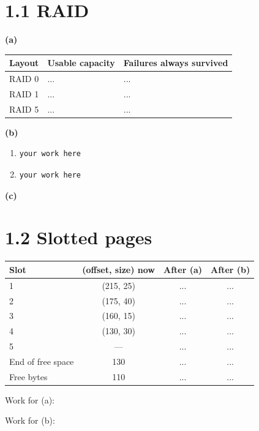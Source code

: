 \section*{1.1 RAID}

\textbf{(a)}

\begin{tabular}{@{}lll@{}}
\toprule
Layout & Usable capacity & Failures always survived \\
\midrule
RAID 0 & ... & ... \\
RAID 1 & ... & ... \\
RAID 5 & ... & ... \\
\bottomrule
\end{tabular}

\textbf{(b)}
\begin{enumerate}
  \item
\begin{lstlisting}
your work here
\end{lstlisting}
  \item
\begin{lstlisting}
your work here
\end{lstlisting}
\end{enumerate}

\textbf{(c)}

\section*{1.2 Slotted pages}

\begin{tabular}{@{}lccc@{}}
\toprule
Slot & (offset, size) now & After (a) & After (b) \\
\midrule
1 & (215, 25) & ... & ... \\
2 & (175, 40) & ... & ... \\
3 & (160, 15) & ... & ... \\
4 & (130, 30) & ... & ... \\
5 & ---       & ... & ... \\
\midrule
End of free space & 130 & ... & ... \\
Free bytes        & 110 & ... & ... \\
\bottomrule
\end{tabular}

Work for (a):

Work for (b):

